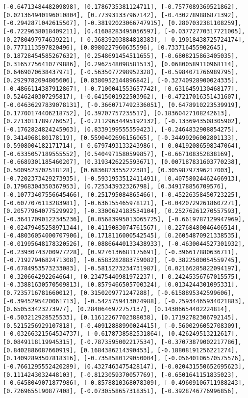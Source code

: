 \documentclass[11pt]{article}
\begin{document}
\begin{Verbatim}[commandchars=\\\{\}]
[-0.6471348448209898], [0.1786735381124711], [-0.7577089369521862], [0.021364940196010804], [0.773931337967142], [-0.4302789886871392], [-0.2942871042615507], [-0.38192023066747915], [0.2807032381108259], [-0.7229638018409211], [0.41608283495056597], [-0.03772770317721005], [0.2780497974639221], [-0.36839203884818383], [-0.19018438725724174], [0.7771113597820496], [0.8980227960635596], [0.733716455902645], [0.18728454585267632], [0.2548691454511655], [-0.6808215863405035], [0.31657756410779886], [0.2962548098581513], [0.06800589110968114], [0.6469070638437971], [-0.5635077298952328], [-0.5984071766989795], [0.2929782094805606], [0.8380952144896842], [-0.32740928900024335], [-0.4866114387912867], [-0.7100041553657742], [0.6316459130468177], [0.5246240307295817], [-0.6415001922503962], [-0.47217016351431607], [-0.04636297839078131], [-0.3660717492336051], [0.6478910223539919], [0.17700174406218752], [0.39707757235517], [0.18360427108242613], [0.2713011789776052], [-0.21129634495192132], [-0.1336943508305902], [-0.1762824824245963], [0.8339199555559423], [-0.2464832908854275], [0.3414968180178119], [0.5590402696156065], [-0.34499296002801133], [0.5908004182171714], [-0.6797493133243986], [-0.04192086598347064], [-0.6335057189555552], [0.5404971580599857], [-0.667108352838169], [-0.6689301185460207], [0.3193426225593671], [0.007187831603770238], [0.5009523702518128], [0.6836823355272381], [0.30598797396217003], [-0.7202373429273935], [-0.5931953512411491], [0.40758024462466913], [0.17968304350367953], [0.725343932326798], [0.349178856709576], [-0.10773407556645466], [0.251795084865466], [-0.45226358450723225], [-0.6077076113283981], [-0.636155465978121], [-0.04207292618607271], [0.20577964077529992], [-0.3300624183534104], [0.25276261270557593], [-0.36417090122345236], [0.05683995013065725], [-0.6619787129947969], [-0.02479405258971344], [0.4119083074761567], [0.22768480046406514], [-0.48036054000707906], [0.1718116000542545], [0.26054870921338535], [-0.01995648178320526], [0.08866440133438933], [-0.4630044527301932], [-0.23930743700977228], [0.9276136681175691], [-0.396617880636711], [-0.7192794682471308], [-0.6583282883759082], [-0.3822500054559745], [-0.6784953573233083], [-0.5815273234731987], [0.02166285822094197], [-0.320664292264664], [0.23475440981972237], [-0.24245356767015575], [-0.33881630570509813], [0.8579466505700324], [0.0134244301095331], [0.7235716781660012], [0.3150209771247288], [-0.6158895342599606], [-0.3945295420061713], [-0.5425759413024988], [-0.25934465934021883], [0.650533423273977], [0.2840646972757137], [0.14306654402224814], [-0.503212928525533], [0.11612267702388038], [0.17192782306792145], [0.5215256929107818], [-0.40912888990024415], [-0.5600296052708309], [-0.03266321564534737], [-0.6178738582531864], [0.426249513212617], [0.0849118119945315], [-0.7873595002217534], [-0.37073879002217786], [0.8402886087660919], [0.1684386214390453], [-0.18808191256221274], [0.14092893507818316], [-0.7358580129050004], [-0.05640106570575576], [-0.7661295552420289], [0.4327463475428147], [-0.020431550652695623], [0.1114243032448103], [-0.8123059370057769], [-0.6501641151835023], [-0.6458049071877986], [-0.8578810368078309], [-0.49609106711988243], [0.7269655190877408], [-0.0730558657318351], [-0.3928746776996856], 
\end{Verbatim}
\end{document}
